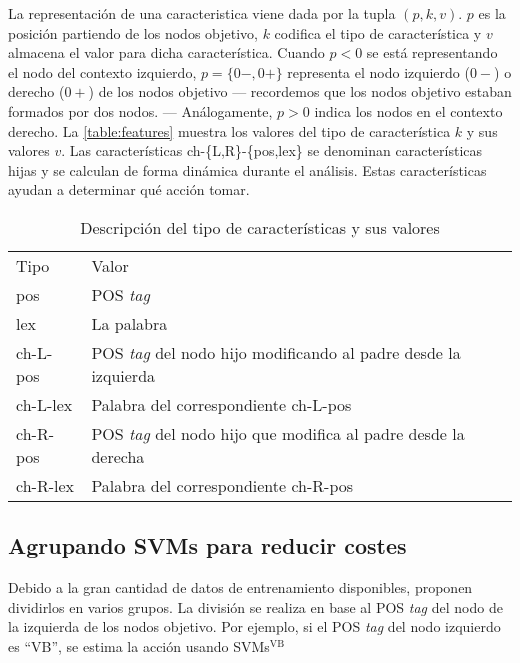 La representación de una caracteristica viene dada por la tupla $(p,k,v)$. $p$
es la posición partiendo de los nodos objetivo, $k$ codifica el tipo de
característica y $v$ almacena el valor para dicha característica. Cuando $p<0$
se está representando el nodo del contexto izquierdo, $p=\{0-,0+\}$ representa
el nodo izquierdo ($0-$) o derecho ($0+$) de los nodos objetivo --- recordemos
que los nodos objetivo estaban formados por dos nodos. --- Análogamente, $p>0$
indica los nodos en el contexto derecho. La \autoref{table:features} muestra los
valores del tipo de característica $k$ y sus valores $v$. Las características
ch-\{L,R\}-\{pos,lex\} se denominan características hijas y se calculan de forma
dinámica durante el análisis. Estas características ayudan a determinar qué
acción tomar.
\begin{table}[ht]
  \centering
  \caption{Descripción del tipo de características y sus valores}
  \label{table:features}

  \begin{tabular}{ll}
    \rowcolor[HTML]{443627} 
    {\color[HTML]{FFFFFF} Tipo} & {\color[HTML]{FFFFFF} Valor}                                                  \\
    pos                         & \ac{POS} \emph{tag}                                                       \\
    lex                         & La palabra                                                                    \\
    ch-L-pos                    & \ac{POS} \emph{tag} del nodo hijo modificando al padre desde la izquierda \\
    ch-L-lex                    & Palabra del correspondiente ch-L-pos                                          \\
    ch-R-pos                    & \ac{POS} \emph{tag} del nodo hijo que modifica al padre desde la derecha  \\
    ch-R-lex                    & Palabra del correspondiente ch-R-pos                                         
  \end{tabular}
\end{table}

\subsection{Agrupando \acp{SVM} para reducir costes}
\label{subsec:svmgrouping}

Debido a la gran cantidad de datos de entrenamiento disponibles,
\citeauthor{yamada2003} proponen dividirlos en varios grupos. La división se
realiza en base al \ac{POS} \emph{tag} del nodo de la izquierda de los nodos
objetivo. Por ejemplo, si el \ac{POS} \emph{tag} del nodo izquierdo es “VB”, se
estima la acción usando \acp{SVM}$^{\text{VB}}$

